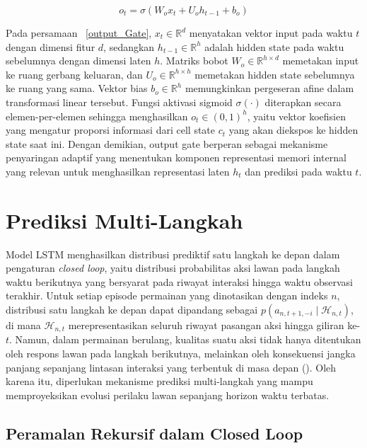 \begin{equation}\label{output_Gate}
o_t = \sigma(W_o x_t + U_o h_{t-1} + b_o)
\end{equation}

Pada persamaan ~\ref{output_Gate}, $x_t \in \mathbb{R}^{d}$ menyatakan vektor input pada waktu $t$ dengan dimensi fitur $d$, sedangkan $h_{t-1} \in \mathbb{R}^{h}$ adalah hidden state pada waktu sebelumnya dengan dimensi laten $h$. Matriks bobot $W_o \in \mathbb{R}^{h \times d}$ memetakan input ke ruang gerbang keluaran, dan $U_o \in \mathbb{R}^{h \times h}$ memetakan hidden state sebelumnya ke ruang yang sama. Vektor bias $b_o \in \mathbb{R}^{h}$ memungkinkan pergeseran afine dalam transformasi linear tersebut. Fungsi aktivasi sigmoid $\sigma(\cdot)$ diterapkan secara elemen-per-elemen sehingga menghasilkan $o_t \in (0,1)^h$, yaitu vektor koefisien yang mengatur proporsi informasi dari cell state $c_t$ yang akan diekspos ke hidden state saat ini. Dengan demikian, output gate berperan sebagai mekanisme penyaringan adaptif yang menentukan komponen representasi memori internal yang relevan untuk menghasilkan representasi laten $h_t$ dan prediksi pada waktu $t$.


\section{Prediksi Multi-Langkah}

Model LSTM menghasilkan distribusi prediktif satu langkah ke depan dalam pengaturan \textit{closed loop}, yaitu distribusi probabilitas aksi lawan pada langkah waktu berikutnya yang bersyarat pada riwayat interaksi hingga waktu observasi terakhir. Untuk setiap episode permainan yang dinotasikan dengan indeks $n$, distribusi satu langkah ke depan dapat dipandang sebagai $p(a_{n,t+1,-i} \mid \mathcal{H}_{n,t})$, di mana $\mathcal{H}_{n,t}$ merepresentasikan seluruh riwayat pasangan aksi hingga giliran ke-$t$. Namun, dalam permainan berulang, kualitas suatu aksi tidak hanya ditentukan oleh respons lawan pada langkah berikutnya, melainkan oleh konsekuensi jangka panjang sepanjang lintasan interaksi yang terbentuk di masa depan (\cite{nashed_survey_2022}). Oleh karena itu, diperlukan mekanisme prediksi multi-langkah yang mampu memproyeksikan evolusi perilaku lawan sepanjang horizon waktu terbatas.

\subsection{Peramalan Rekursif dalam Closed Loop}

